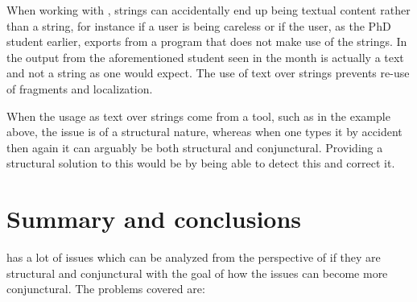 When working with {\bibtex}, strings can accidentally end up being
textual content rather than a string, for instance if a user is being
careless or if the user, as the PhD student earlier, exports from a
program that does not make use of the strings.  In the output from the
aforementioned student seen in  the month
is actually a text and not a string as one would expect.  The use of
text over strings prevents re-use of fragments and localization.

When the usage as text over strings come from a tool, such as in the
example above, the issue is of a structural nature, whereas when one
types it by accident then again it can arguably be both structural and
conjunctural.  Providing a structural solution to this would be by
being able to detect this and correct it.


\section{Summary and conclusions}
\label{sec:problems_conclusion}

{\bibtex} has a lot of issues which can be analyzed from the
perspective of if they are structural and conjunctural with the goal
of how the issues can become more conjunctural.  The problems covered
are:

